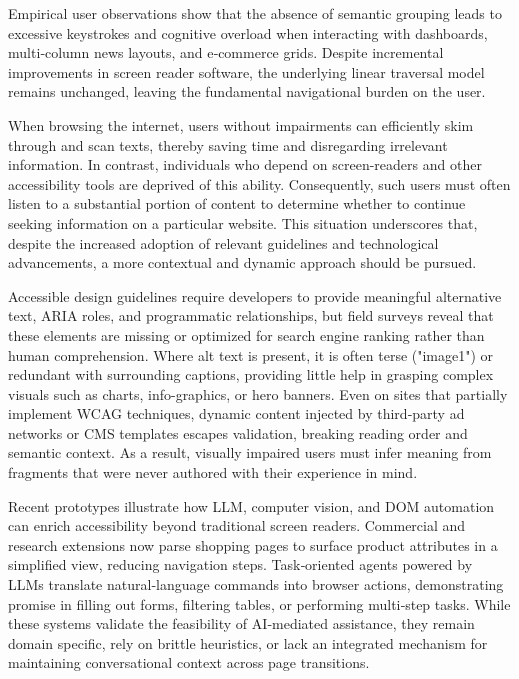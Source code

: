 \documentclass[conference]{IEEEtran}
\begin{document}
Empirical user observations show that the absence of semantic grouping leads to excessive keystrokes and cognitive overload when interacting with dashboards, multi‑column news layouts, and e‑commerce grids. Despite incremental improvements in screen reader software, the underlying linear traversal model remains unchanged, leaving the fundamental navigational burden on the user. \cite{ferdous2021semantic}

When browsing the internet, users without impairments can efficiently skim through and scan texts, thereby saving time and disregarding irrelevant information. In contrast, individuals who depend on screen-readers and other accessibility tools are deprived of this ability. Consequently, such users must often listen to a substantial portion of content to determine whether to continue seeking information on a particular website. \cite{Ramakrishnan2017-rn} This situation underscores that, despite the increased adoption of relevant guidelines and technological advancements, a more contextual and dynamic approach should be pursued.

Accessible design guidelines require developers to provide meaningful alternative text, ARIA roles, and programmatic relationships, but field surveys reveal that these elements are missing or optimized for search engine ranking rather than human comprehension. \cite{wcag2023} Where alt text is present, it is often terse ("image1") or redundant with surrounding captions, providing little help in grasping complex visuals such as charts, info-graphics, or hero banners. Even on sites that partially implement WCAG techniques, dynamic content injected by third‑party ad networks or CMS templates escapes validation, breaking reading order and semantic context. \cite{wcagchallenges2025} As a result, visually impaired users must infer meaning from fragments that were never authored with their experience in mind.

Recent prototypes illustrate how LLM, computer vision, and DOM automation can enrich accessibility beyond traditional screen readers. Commercial and research extensions now parse shopping pages to surface product attributes in a simplified view, reducing navigation steps. \cite{prakash2024} Task‑oriented agents powered by LLMs translate natural‑language commands into browser actions, demonstrating promise in filling out forms, filtering tables, or performing multi‑step tasks. \cite{he2024webvoyager} While these systems validate the feasibility of AI‑mediated assistance, they remain domain specific, rely on brittle heuristics, or lack an integrated mechanism for maintaining conversational context across page transitions.\cite{kodandaram2024,mehendale2024}
\end{document}
